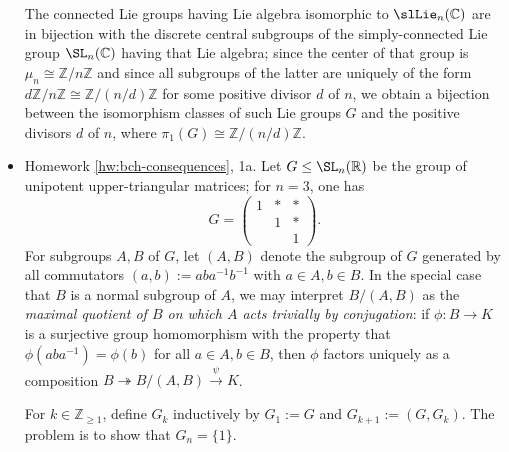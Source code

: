 \documentclass[reqno]{amsart} 
\begin{document}
\begin{itemize}
  The connected Lie groups having Lie algebra isomorphic
  to $\slLie_n(\mathbb{C})$
  are in bijection with the discrete central subgroups
  of the simply-connected Lie group $\SL_n(\mathbb{C})$
  having that Lie algebra;
  since the center of that group is $\mu_n \cong \mathbb{Z}/n \mathbb{Z}$
  and since all subgroups of the latter
  are uniquely of the form $d \mathbb{Z} / n \mathbb{Z} \cong \mathbb{Z} / (n/d) \mathbb{Z}$
  for some positive divisor $d$ of $n$,
  we obtain a bijection between the isomorphism classes of such
  Lie groups $G$ 
  and the positive divisors $d$ of $n$,
  where $\pi_1(G) \cong \mathbb{Z} / (n/d) \mathbb{Z}$.
\item Homework \ref{hw:bch-consequences},
  1a.
  Let $G \leq \SL_{n}(\mathbb{R})$
  be the group of unipotent upper-triangular matrices;
  for $n = 3$,
  one has
  \begin{equation*}
  G = 
\begin{pmatrix}
    1 & \ast & \ast \\
    & 1 & \ast \\
    &  & 1
  \end{pmatrix}
.
  \end{equation*}
  For subgroups $A,B$ of $G$,
  let $(A,B)$ denote the subgroup of $G$
  generated by all commutators $(a,b) := a b a^{-1} b^{-1}$
  with $a \in A, b \in B$.
  In the special case that $B$ is a normal
  subgroup of $A$,
  we may interpret $B/(A,B)$ as the \emph{maximal quotient
    of $B$ on which $A$ acts trivially by conjugation}:
  if $\phi : B \rightarrow K$ is a surjective group homomorphism
  with the property that $\phi(a b a^{-1}) = \phi(b)$
  for all $a \in A, b \in B$,
  then $\phi$ factors uniquely
  as a composition
  $B \twoheadrightarrow B/(A,B) \xrightarrow{\psi} K$.

  For $k \in \mathbb{Z}_{\geq 1}$,
  define $G_k$ inductively
  by
  $G_1 := G$
  and $G_{k+1} := (G,G_k)$.
  The problem is to show that $G_{n} = \{1\}$.


\end{itemize}
\end{document}
